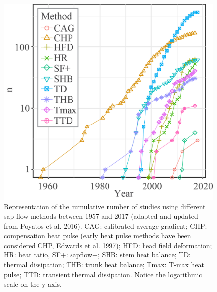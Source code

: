 \documentclass[11pt,twoside]{reedthesis}
\begin{document}
\setlength{\abovecaptionskip}{15pt}
\begin{figure}[hbt!]

{\centering \includegraphics[width=0.8\linewidth]{figure/appendixA1/fig1} 

}

\caption[Representation of the cumulative number of studies using different sap flow methods between 1957 and 2017]{Representation of the cumulative number of studies using different sap flow methods between 1957 and 2017 (adapted and updated from Poyatos et al. 2016). CAG: calibrated average gradient; CHP: compensation heat pulse (early heat pulse methods have been considered CHP, Edwards et al. 1997); HFD: head field deformation; HR: heat ratio, SF+: sapflow+; SHB: stem heat balance; TD: thermal dissipation; THB: trunk heat balance; Tmax: T-max heat pulse; TTD: transient thermal dissipation. Notice the logarithmic scale on the y-axis.}\label{fig:apa11}
\end{figure}
\setlength{\abovecaptionskip}{0pt} \newpage
\end{document}
